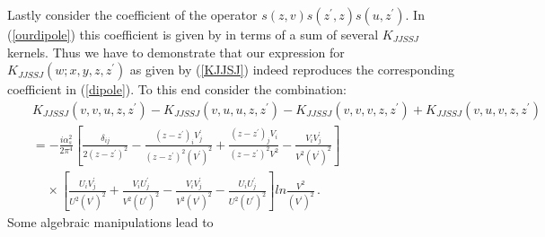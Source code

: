\documentclass[11pt,a4paper]{article}
\begin{document}
 Lastly consider the coefficient of the operator $s(z,v)s(z^{\prime},z)s(u,z^{\prime})$. In (\ref{ourdipole}) this coefficient is given by in terms of a sum of several $K_{JJSSJ}$ kernels.
 Thus we have to demonstrate that our expression for $K_{JJSSJ}(w;x,y,z,z^{\prime})$ as given by (\ref{KJJSJ}) indeed reproduces the corresponding
coefficient in  (\ref{dipole}).
 To this end consider the combination:
\begin{eqnarray}
&&K_{JJSSJ}(v,v,u,z,z^{\prime})-K_{JJSSJ}(v,u,u,z,z^{\prime})-K_{JJSSJ}(v,v,v,z,z^{\prime})+K_{JJSSJ}(v,u,v,z,z^{\prime})\nonumber \\
&&=-\frac{i\alpha_{s}^{2}}{2\pi^{4}}\left[\frac{\delta_{ij}}{2(z-z^{\prime})^{2}}-\frac{(z-z^{\prime})_{i}V_{j}^{\prime}}{(z-z^{\prime})^{2}(V^{\prime})^{2}}+\frac{(z-z^{\prime})_{j}V_{i}}{(z-z^{\prime})^{2}V^{2}}-\frac{V_{i}V_{j}^{\prime}}{V^{2}(V^{\prime})^{2}}\right]\nonumber \\
&&\ \ \ \ \ \times \left[\frac{U_{i}V_{j}^{\prime}}{U^{2}(V^{\prime})^{2}}+\frac{V_{i}U_{j}^{\prime}}{V^{2}(U^{\prime})^{2}}-\frac{V_{i}V_{j}^{\prime}}{V^{2}(V^{\prime})^{2}}-\frac{U_{i}U_{j}^{\prime}}{U^{2}(U^{\prime})^{2}}\right]ln\frac{V^{2}}{(V^{\prime})^{2}}\,.
 \end{eqnarray}
Some algebraic manipulations lead to
\end{document}
